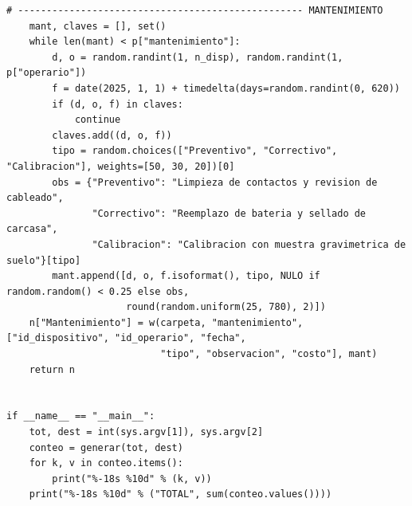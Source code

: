 \documentclass[11pt,letterpaper]{article}
\begin{document}
\begin{lstlisting}[style=py]
    # -------------------------------------------------- MANTENIMIENTO
    mant, claves = [], set()
    while len(mant) < p["mantenimiento"]:
        d, o = random.randint(1, n_disp), random.randint(1, p["operario"])
        f = date(2025, 1, 1) + timedelta(days=random.randint(0, 620))
        if (d, o, f) in claves:
            continue
        claves.add((d, o, f))
        tipo = random.choices(["Preventivo", "Correctivo", "Calibracion"], weights=[50, 30, 20])[0]
        obs = {"Preventivo": "Limpieza de contactos y revision de cableado",
               "Correctivo": "Reemplazo de bateria y sellado de carcasa",
               "Calibracion": "Calibracion con muestra gravimetrica de suelo"}[tipo]
        mant.append([d, o, f.isoformat(), tipo, NULO if random.random() < 0.25 else obs,
                     round(random.uniform(25, 780), 2)])
    n["Mantenimiento"] = w(carpeta, "mantenimiento", ["id_dispositivo", "id_operario", "fecha",
                           "tipo", "observacion", "costo"], mant)
    return n


if __name__ == "__main__":
    tot, dest = int(sys.argv[1]), sys.argv[2]
    conteo = generar(tot, dest)
    for k, v in conteo.items():
        print("%-18s %10d" % (k, v))
    print("%-18s %10d" % ("TOTAL", sum(conteo.values())))
\end{lstlisting}
\end{document}
